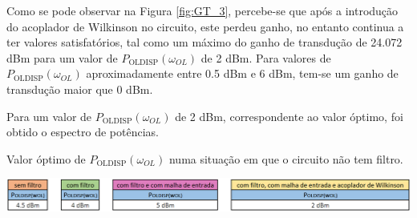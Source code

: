 \documentclass[11pt]{article}
\numberwithin{equation}{section}
\begin{document}
Como se pode observar na Figura \ref{fig:GT_3}, percebe-se que após a introdução do acoplador de Wilkinson no circuito, este perdeu ganho, no entanto continua a ter valores satisfatórios, tal como um máximo do ganho de transdução de 24.072 dBm para um valor de $ P_{\text{OLDISP}}\left(\omega_{OL}\right) $ de 2 dBm. Para valores de $ P_{\text{OLDISP}}\left(\omega_{OL}\right) $ aproximadamente entre 0.5 dBm e 6 dBm, tem-se um ganho de transdução maior que 0 dBm.

Para um valor de $ P_{\text{OLDISP}}\left(\omega_{OL}\right) $ de 2 dBm, correspondente ao valor óptimo, foi obtido o espectro de potências.

\begin{table}[h]
	\centering
	\caption{Valor óptimo de $ P_{\text{OLDISP}}\left(\omega_{OL}\right) $ numa situação em que o circuito não tem filtro.}
	\vspace{-1.5mm}
	\includegraphics[keepaspectratio=true, scale=0.45]{teoricas/poldispSemComFiltroMalhaAcop}
\end{table}

\pagebreak
\end{document}
